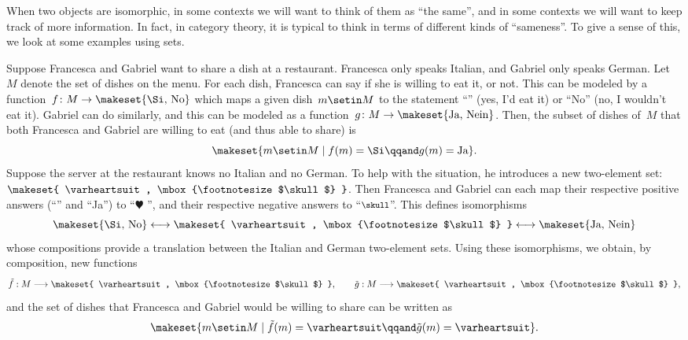 When two objects are isomorphic, in some contexts we will want to think of them as ``the same'', and in some contexts we will want to keep track of more information.
In fact, in category theory, it is typical to think in terms of different kinds of ``sameness''.
To give a sense of this, we look at some examples using sets.

\begin{example}
    Suppose Francesca and Gabriel want to share a dish at a restaurant.
    Francesca only speaks Italian, and Gabriel only speaks German.
    Let~$M$ denote the set of dishes on the menu.
    For each dish, Francesca can say if she is willing to eat it, or not.
    This can be modeled by a function~$f\colon M \to \makeset{ \text{\Si, No} }$ which maps a given dish~$m \setin M$ to the statement ``\Si'' (yes, I'd eat it) or ``No'' (no, I wouldn't eat it).
    Gabriel can do similarly, and this can be modeled as a function~$g\colon M \to \makeset{ \text{Ja, Nein} }$.
    Then, the subset of dishes of~$M$ that both Francesca and Gabriel are willing to eat (and thus able to share) is
    \begin{equation}
        \makeset{ m \setin M \mid f(m) = \text{\Si}  \qqand  g(m) = \text{Ja} }.
    \end{equation}
    Suppose the server at the restaurant knows no Italian and no German.
    To help with the situation, he introduces a new two-element set: $\makeset{ \varheartsuit, \mbox{\footnotesize $\skull$} }$.
    Then Francesca and Gabriel can each map their respective positive answers (``\Si'' and ``Ja'') to ``$\varheartsuit$ '', and their respective negative answers to ``$\mbox{\footnotesize $\skull$}$''.
    This defines isomorphisms
    \begin{equation}
        \makeset{ \text{\Si, No} } \longleftrightarrow \makeset{ \varheartsuit, \mbox{\footnotesize $\skull$} } \longleftrightarrow \makeset{ \text{Ja, Nein} }
    \end{equation}
    whose compositions provide a translation between the Italian and German two-element sets.
    Using these isomorphisms, we obtain, by composition, new functions
    \begin{equation}
        \tilde f: M \longrightarrow \makeset{ \varheartsuit, \mbox{\footnotesize $\skull$} }, \qquad \tilde g: M \longrightarrow \makeset{ \varheartsuit, \mbox{\footnotesize $\skull$} },
    \end{equation}
    and the set of dishes that Francesca and Gabriel would be willing to share can be written as
    \begin{equation}
        \makeset{ m \setin M \mid \tilde f(m) = \varheartsuit \qqand \tilde g(m) = \varheartsuit }.
    \end{equation}


\end{example}
